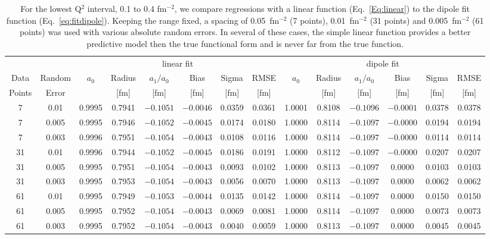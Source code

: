 \documentclass[10pt,superscriptaddress,aps,prc,twocolumn]{revtex4-1}
\begin{document}
\begin{table}
\caption{For the lowest Q$^2$ interval, 0.1 to 0.4 fm$^{-2}$, we compare regressions with
a linear function (Eq.~\ref{Eq:linear}) to the dipole fit function (Eq.~\ref{eq:fitdipole}).   Keeping the range
fixed, a spacing of 0.05~fm$^{-2}$ (7 points), 0.01~fm$^{-2}$ (31 points) and 0.005~fm$^{-2}$ (61 points)
was used with various absolute random errors.  In several of these cases, the simple linear 
function provides a better predictive model then the true functional form and is never 
far from the true function.}
\begin{tabular}{cc|cccccc|cccccc} \hline
       &          & \multicolumn{6}{c|}{linear fit}                       & \multicolumn{6}{c}{dipole fit}                     \\ 
Data   & Random   & $a_0$ & Radius &  $a_1/a_0$ &  Bias  & Sigma &  RMSE  & $a_0$ & Radius & $a_1/a_0$ &  Bias & Sigma &  RMSE \\  
Points & Error    &       & [fm]   &   [fm]     & [fm]   &  [fm] &  [fm]  &       & [fm]   &  [fm]     & [fm]  &  [fm] &  [fm] \\  \hline
7      & 0.01     & 0.9995& 0.7941& $-0.1051$& $-0.0046$& 0.0359& 0.0361 & 1.0001& 0.8108& $-0.1096$& $-0.0001$& 0.0378& 0.0378  \\ 
7      & 0.005    & 0.9995& 0.7946& $-0.1052$& $-0.0045$& 0.0174& 0.0180 & 1.0000& 0.8114& $-0.1097$& $-0.0000$& 0.0194& 0.0194  \\
7      & 0.003    & 0.9996& 0.7951& $-0.1054$& $-0.0043$& 0.0108& 0.0116 & 1.0000& 0.8114& $-0.1097$& $-0.0000$& 0.0114& 0.0114  \\ \hline
31     & 0.01     & 0.9996& 0.7944& $-0.1052$& $-0.0045$& 0.0186& 0.0191 & 1.0000& 0.8112& $-0.1097$& $-0.0000$& 0.0207& 0.0207  \\
31     & 0.005    & 0.9995& 0.7951& $-0.1054$& $-0.0043$& 0.0093& 0.0102 & 1.0000& 0.8113& $-0.1097$&  0.0000& 0.0103& 0.0103  \\
31     & 0.003    & 0.9995& 0.7953& $-0.1054$& $-0.0043$& 0.0056& 0.0070 & 1.0000& 0.8113& $-0.1097$&  0.0000& 0.0062& 0.0062   \\ \hline 
61     & 0.01     & 0.9995& 0.7949& $-0.1053$& $-0.0044$& 0.0135& 0.0142 & 1.0000& 0.8114& $-0.1097$&  0.0000& 0.0150& 0.0150  \\ 
61     & 0.005    & 0.9995& 0.7952& $-0.1054$& $-0.0043$& 0.0069& 0.0081 & 1.0000& 0.8114& $-0.1097$&  0.0000& 0.0073& 0.0073  \\ 
61     & 0.003    & 0.9995& 0.7952& $-0.1054$& $-0.0043$& 0.0040& 0.0059 & 1.0000& 0.8113& $-0.1097$&  0.0000& 0.0045& 0.0045  \\ \hline 
\end{tabular}
\label{simpleVSperfect}
\end{table}
\end{document}
